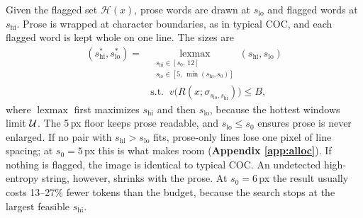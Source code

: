 Given the flagged set $\mathcal{H}(x)$, prose words are drawn at $s_{\mathrm{lo}}$ and flagged words at $s_{\mathrm{hi}}$.
Prose is wrapped at character boundaries, as in typical COC, and each flagged word is kept whole on one line.
The sizes are
\begin{equation}
\begin{aligned}
  (s_{\mathrm{hi}}^{\ast}, s_{\mathrm{lo}}^{\ast}) = &\operatorname*{lexmax}_{\substack{s_{\mathrm{hi}}\in[s_0,\,12]\\ s_{\mathrm{lo}}\in[5,\,\min(s_{\mathrm{hi}},s_0)]}} (s_{\mathrm{hi}}, s_{\mathrm{lo}})\\
  &\text{s.t.}\;\; v\big(R(x;\sigma_{s_{\mathrm{lo}},s_{\mathrm{hi}}})\big)\le B ,
\end{aligned}
  \label{eq:alloc}
\end{equation}
where $\operatorname{lexmax}$ first maximizes $s_{\mathrm{hi}}$ and then $s_{\mathrm{lo}}$, because the hottest windows limit $\mathcal{U}$.
The 5\,px floor keeps prose readable, and $s_{\mathrm{lo}}\le s_0$ ensures prose is never enlarged.
If no pair with $s_{\mathrm{hi}}>s_{\mathrm{lo}}$ fits, prose-only lines lose one pixel of line spacing; at $s_0=5$\,px this is what makes room (\textbf{Appendix \ref{app:alloc}}).
If nothing is flagged, the image is identical to typical COC.
An undetected high-entropy string, however, shrinks with the prose.
At $s_0=6$\,px the result usually costs 13--27\% fewer tokens than the budget, because the search stops at the largest feasible $s_{\mathrm{hi}}$.
